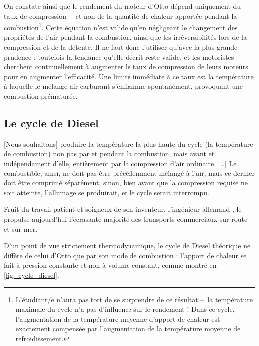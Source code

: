 		On constate ainsi que le rendement du moteur d’Otto dépend uniquement du taux de compression --\ et non de la quantité de chaleur apportée pendant la combustion\footnote{L’étudiant/e n’aura pas tort de se surprendre de ce résultat --\ la température maximale du cycle n’a pas d’influence sur le rendement ! Dans ce cycle, l’augmentation de la température moyenne d’apport de chaleur est exactement compensée par l’augmentation de la température moyenne de refroidissement.}. Cette équation n’est valide qu’en négligeant le changement des propriétés de l’air pendant la combustion, ainsi que les irréversibilités lors de la compression et de la détente. Il ne faut donc l’utiliser qu’avec la plus grande prudence ; toutefois la tendance qu’elle décrit reste valide, et les motoristes cherchent continuellement à augmenter le taux de compression de leurs moteurs pour en augmenter l’efficacité. Une limite immédiate à ce taux est la température à laquelle le mélange air-carburant s’enflamme spontanément, provoquant une combustion prématurée.

	\subsection{Le cycle de Diesel}
	\label{ch_cycle_diesel}

			[Nous souhaitons] produire la température la plus haute du cycle (la température de combustion) non pas par et pendant la combustion, mais avant et indépendament d’elle, entièrement par la compression d’air ordinaire. […]
Le combustible, ainsi, ne doit pas être précédemment mélangé à l’air, mais ce dernier doit être comprimé séparément, sinon, bien avant que la compression requise ne soit atteinte, l’allumage se produirait, et le cycle serait interrompu.
		
		Fruit du travail patient et soigneux de son inventeur, l’ingénieur allemand , le  propulse aujourd’hui l’écrasante majorité des transports commerciaux sur route et sur mer.

		D’un point de vue strictement thermodynamique, le cycle de Diesel théorique ne diffère de celui d’Otto que par son mode de combustion : l’apport de chaleur se fait à pression constante et non à volume constant, comme montré en \cref{fig_cycle_diesel}.

